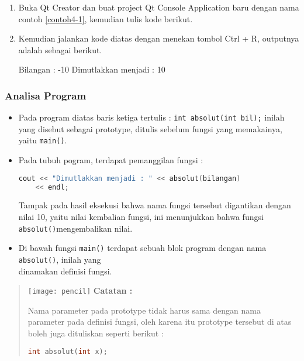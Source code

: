 \begin{enumerate}

\item
  Buka Qt Creator dan buat project Qt Console Application baru dengan
  nama contoh \ref{contoh4-1}, kemudian tulis kode berikut.



\item
  Kemudian jalankan kode diatas dengan menekan tombol Ctrl + R, outputnya
  adalah sebagai berikut.
  \begin{lcverbatim}
Bilangan : -10
Dimutlakkan menjadi : 10
  \end{lcverbatim}
\end{enumerate}

\subsubsection*{Analisa Program }

\begin{itemize}

\item
  Pada program diatas baris ketiga tertulis :
  \texttt{int\ absolut(int\ bil);} inilah yang disebut sebagai
  prototype, ditulis sebelum fungsi yang memakainya, yaitu
  \texttt{main()}.\\
\item
  Pada tubuh pogram, terdapat pemanggilan fungsi :


\begin{lstlisting}[language=c++, numbers=none]
	cout << "Dimutlakkan menjadi : " << absolut(bilangan)
	<< endl;
\end{lstlisting}

Tampak pada hasil eksekusi bahwa nama fungsi tersebut digantikan dengan
nilai 10, yaitu nilai kembalian fungsi, ini menunjukkan bahwa fungsi
\texttt{absolut()}mengembalikan nilai.


\item
  Di bawah fungsi \texttt{main()} terdapat sebuah blok program dengan
  nama \texttt{absolut()}, inilah yang\\
  dinamakan definisi fungsi.

\end{itemize}
\begin{quotation}
		\texttt{[image: pencil]}	 \textbf{Catatan :}
		
		Nama parameter pada prototype tidak
		harus sama dengan nama parameter pada definisi fungsi, oleh karena itu
		prototype tersebut di atas boleh juga dituliskan seperti berikut :
		
\begin{lstlisting}[language=c++, numbers=none]
int absolut(int x);
\end{lstlisting}
	
	 
\end{quotation}


